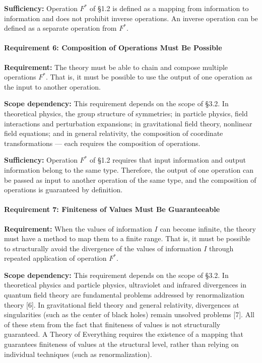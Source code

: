 \documentclass[a4paper,11pt]{article}
\begin{document}
\textbf{Sufficiency:} Operation \(F^*\) of §1.2 is defined as a mapping
from information to information and does not prohibit inverse
operations. An inverse operation can be defined as a separate operation
from \(F^*\).

\paragraph{Requirement 6: Composition of Operations Must Be
Possible}\label{requirement-6-composition-of-operations-must-be-possible}

\textbf{Requirement:} The theory must be able to chain and compose
multiple operations \(F^*\). That is, it must be possible to use the
output of one operation as the input to another operation.

\textbf{Scope dependency:} This requirement depends on the scope of
§3.2. In theoretical physics, the group structure of symmetries; in
particle physics, field interactions and perturbation expansions; in
gravitational field theory, nonlinear field equations; and in general
relativity, the composition of coordinate transformations --- each
requires the composition of operations.

\textbf{Sufficiency:} Operation \(F^*\) of §1.2 requires that input
information and output information belong to the same type. Therefore,
the output of one operation can be passed as input to another operation
of the same type, and the composition of operations is guaranteed by
definition.

\paragraph{Requirement 7: Finiteness of Values Must Be
Guaranteeable}\label{requirement-7-finiteness-of-values-must-be-guaranteeable}

\textbf{Requirement:} When the values of information \(I\) can become
infinite, the theory must have a method to map them to a finite range.
That is, it must be possible to structurally avoid the divergence of the
values of information \(I\) through repeated application of operation
\(F^*\).

\textbf{Scope dependency:} This requirement depends on the scope of
§3.2. In theoretical physics and particle physics, ultraviolet and
infrared divergences in quantum field theory are fundamental problems
addressed by renormalization theory {[}6{]}. In gravitational field
theory and general relativity, divergences at singularities (such as the
center of black holes) remain unsolved problems {[}7{]}. All of these
stem from the fact that finiteness of values is not structurally
guaranteed. A Theory of Everything requires the existence of a mapping
that guarantees finiteness of values at the structural level, rather
than relying on individual techniques (such as renormalization).
\end{document}
